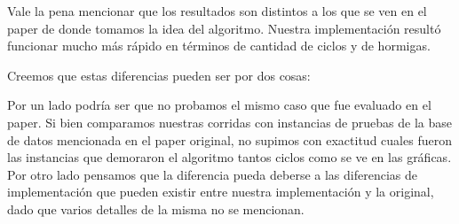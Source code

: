 \documentclass[a4paper,spanish]{article}
\begin{document}
Vale la pena mencionar que los resultados son distintos a los que se ven en el paper de
donde tomamos la idea del algoritmo. Nuestra implementación resultó funcionar mucho más rápido
en términos de cantidad de ciclos y de hormigas.

Creemos que estas diferencias pueden ser por dos cosas: 

Por un lado podría ser que no probamos el mismo caso que fue evaluado en el paper. Si bien 
comparamos nuestras corridas con instancias de pruebas de la base de datos mencionada en el paper
original, no supimos con exactitud cuales fueron las instancias que demoraron el algoritmo tantos
ciclos como se ve en las gráficas. Por otro lado pensamos que la diferencia pueda deberse a las
diferencias de implementación que pueden existir entre nuestra implementación y la original, dado
que varios detalles de la misma no se mencionan.


\clearpage


\end{document}
